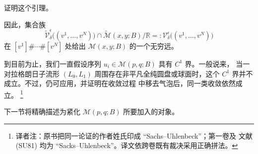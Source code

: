 \begin{exercise}
\label{ex:neighborhood-characterization-chain-convergence}
证明这个引理。
\end{exercise}

因此，集合族
\begin{equation}
  \widetilde{\mathcal V}^{\epsilon}_{\delta}
  \bigl((v^1,\ldots,v^N)\bigr)
  \cap
  \widetilde{\mathcal M}(x,y;B)/\mathbb R
  =:
  \mathcal V^{\epsilon}_{\delta}
  \bigl((v^1,\ldots,v^N)\bigr)
\label{eq:splitting-end-neighborhood-basis}
\end{equation}
在 $[v^1]\#\cdots\#[v^N]$ 处给出 $\mathcal M(x,y;B)$ 的一个无穷远\termNeighborhoodBasis{}。

到目前为止，我们一直假设序列 $u_i\in\mathcal M(p,q;B)$ 具有 $C^1$ 界。一般说来，
当一对拉格朗日子流形 $(L_0,L_1)$ 周围存在非平凡全纯圆盘或球面时，这个 $C^1$
界并不成立。不过，仍可应用\termSacksUhlenbeckBubblingArgument{}，并证明在收敛过程
中移去气泡后，同一类收敛依然成立。
\footnote{译者注：原书把同一论证的作者姓氏印成 “Sachs--Uhlenbeck”；第一卷及
文献 (SU81) 均为 “Sacks--Uhlenbeck”。译文依跨卷既有裁决采用正确拼法。}

下一节将精确描述为紧化 $\mathcal M(p,q;B)$ 所要加入的对象。
